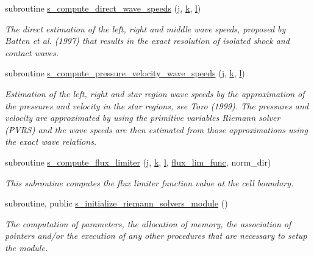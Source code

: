 \begin{DoxyCompactItemize}
subroutine \hyperlink{namespacem__riemann__solvers_a1adcb619a7800a87bf5785ca59c63233}{s\+\_\+compute\+\_\+direct\+\_\+wave\+\_\+speeds} (\hyperlink{m__rhs_8f90_aeadbc0ce9b66517f8fde156199772ec1}{j}, \hyperlink{m__rhs_8f90_af22c486581933c52df7d4aa306382074}{k}, \hyperlink{m__rhs_8f90_a2ac747380de0e6e5e11b01f4137fb75c}{l})
\begin{DoxyCompactList}\small\item\em The direct estimation of the left, right and middle wave speeds, proposed by Batten et al. (1997) that results in the exact resolution of isolated shock and contact waves. \end{DoxyCompactList}\item 
subroutine \hyperlink{namespacem__riemann__solvers_a107a13616d23f81b60bab83209067b01}{s\+\_\+compute\+\_\+pressure\+\_\+velocity\+\_\+wave\+\_\+speeds} (\hyperlink{m__rhs_8f90_aeadbc0ce9b66517f8fde156199772ec1}{j}, \hyperlink{m__rhs_8f90_af22c486581933c52df7d4aa306382074}{k}, \hyperlink{m__rhs_8f90_a2ac747380de0e6e5e11b01f4137fb75c}{l})
\begin{DoxyCompactList}\small\item\em Estimation of the left, right and star region wave speeds by the approximation of the pressures and velocity in the star regions, see Toro (1999). The pressures and velocity are approximated by using the primitive variables Riemann solver (P\+V\+RS) and the wave speeds are then estimated from those approximations using the exact wave relations. \end{DoxyCompactList}\item 
subroutine \hyperlink{namespacem__riemann__solvers_a6301a5631fda64dd97c11777807a22c9}{s\+\_\+compute\+\_\+flux\+\_\+limiter} (\hyperlink{m__rhs_8f90_aeadbc0ce9b66517f8fde156199772ec1}{j}, \hyperlink{m__rhs_8f90_af22c486581933c52df7d4aa306382074}{k}, \hyperlink{m__rhs_8f90_a2ac747380de0e6e5e11b01f4137fb75c}{l}, \hyperlink{namespacem__riemann__solvers_a7af64bd01982bc9c8e40b9a662d106c5}{flux\+\_\+lim\+\_\+func}, norm\+\_\+dir)
\begin{DoxyCompactList}\small\item\em This subroutine computes the flux limiter function value at the cell boundary. \end{DoxyCompactList}\item 
subroutine, public \hyperlink{namespacem__riemann__solvers_aab7e6bf69b7d0b8b9d911f418b872130}{s\+\_\+initialize\+\_\+riemann\+\_\+solvers\+\_\+module} ()
\begin{DoxyCompactList}\small\item\em The computation of parameters, the allocation of memory, the association of pointers and/or the execution of any other procedures that are necessary to setup the module. \end{DoxyCompactList}\item 

\end{DoxyCompactItemize}
